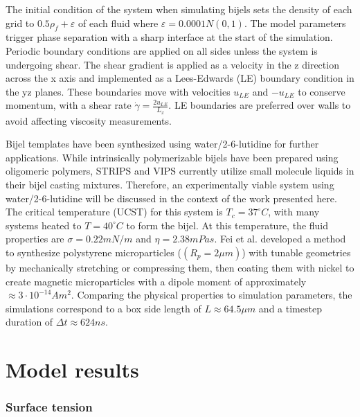 The initial condition of the system when simulating bijels sets the density of each grid to $0.5\rho_f + \varepsilon$ of each fluid where $\varepsilon = 0.0001N(0,1)$. The model parameters trigger phase separation with a sharp interface at the start of the simulation. Periodic boundary conditions are applied on all sides unless the system is undergoing shear. The shear gradient is applied as a velocity in the z direction across the x axis and implemented as a Lees-Edwards (LE) boundary condition in the yz planes. \cite{wagner_leesedwards_2002, lorenz_lees-edwards_2009, yang_capillary_2022} These boundaries move with velocities $u_{LE}$ and $-u_{LE}$ to conserve momentum, with a shear rate $\dot{\gamma} = \frac{2 u_{LE}}{L_x}$. LE boundaries are preferred over walls to avoid affecting viscosity measurements. \cite{wagner_leesedwards_2002, lorenz_lees-edwards_2009, yang_capillary_2022}

Bijel templates have been synthesized using water/2-6-lutidine for further applications. \cite{lee_making_2013} While intrinsically polymerizable bijels have been prepared using oligomeric polymers, STRIPS and VIPS currently utilize small molecule liquids in their bijel casting mixtures. Therefore, an experimentally viable system using water/2-6-lutidine will be discussed in the context of the work presented here. The critical temperature (UCST) for this system is $T_c = 37 ^{\circ}C$, with many systems heated to $T = 40^{\circ}C$ to form the bijel. At this temperature, the fluid properties are $\sigma = 0.22 mN/m$ and $\eta = 2.38 mPas$. \cite{grattoni_lower_1993} Fei et al. developed a method to synthesize polystyrene microparticles ($(R_p = 2 \mu m)$) with tunable geometries by mechanically stretching or compressing them, then coating them with nickel to create magnetic microparticles with a dipole moment of approximately$\approx 3 \cdot 10^{-14} Am^2$. \cite{fei_active_2017, fei_magneto-capillary_2020} Comparing the physical properties to simulation parameters, the simulations correspond to a box side length of $L \approx 64.5 \mu m$ and a timestep duration of $\Delta t \approx 624 ns$. 

\section{Model results}

\subsubsection{Surface tension}

